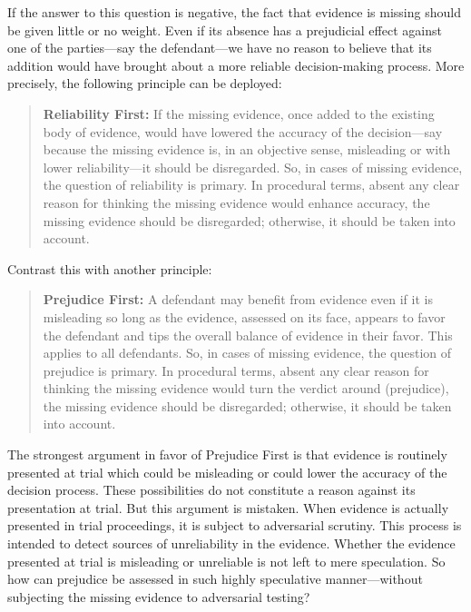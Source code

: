 \documentclass[
  10pt,
  dvipsnames,enabledeprecatedfontcommands]{scrartcl}
\begin{document}
If the answer to this question is negative, the fact that evidence is
missing should be given little or no weight. Even if its absence has a
prejudicial effect against one of the parties---say the defendant---we
have no reason to believe that its addition would have brought about a
more reliable decision-making process. More precisely, the following
principle can be deployed:

\begin{quote} \textbf{Reliability First:} If the missing evidence, once added to the existing body of evidence, would have lowered the accuracy of the decision---say because the missing evidence is, in an objective sense, misleading or with lower reliability---it should be disregarded. So, in cases of missing evidence, the question of reliability is primary. In procedural terms, absent any clear reason for thinking the missing evidence would enhance accuracy, the missing evidence should be disregarded; otherwise, it should be taken into account.
\end{quote}

\noindent Contrast this with another principle:

\begin{quote}
 \textbf{Prejudice First:} A defendant may benefit from evidence even if it is misleading  so long as the evidence, assessed on its face, appears to favor the defendant and tips the overall balance of evidence in their favor. This applies to all defendants. So, in cases of missing evidence, the question of prejudice is primary. In procedural terms, absent any clear reason for thinking the missing evidence would turn the verdict around (prejudice), the missing evidence should be disregarded; otherwise, it should be taken into account.
\end{quote}

\noindent The strongest argument in favor of Prejudice First is that
evidence is routinely presented at trial which could be misleading or
could lower the accuracy of the decision process. These possibilities do
not constitute a reason against its presentation at trial. But this
argument is mistaken. When evidence is actually presented in trial
proceedings, it is subject to adversarial scrutiny. This process is
intended to detect sources of unreliability in the evidence. Whether the
evidence presented at trial is misleading or unreliable is not left to
mere speculation. So how can prejudice be assessed in such highly
speculative manner---without subjecting the missing evidence to
adversarial testing?
\end{document}
